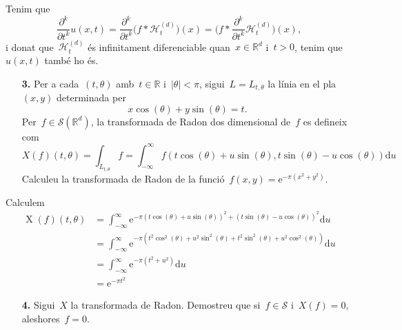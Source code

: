\documentclass[a4paper]{article}
\theoremstyle{plain}
\theoremstyle{definition}
\DeclareMathOperator{\X}{X}
\newcommand{\e}{\mathrm{e}}
\providecommand{\uppi}{\pi}
\newcommand{\diff}{\mathrm{d}}
\newcommand{\abs}[1]{\lvert{#1}\rvert}
\newcommand{\Sc}{\mathcal{S}}
\newcommand{\Hk}{\mathcal{H}}
\newcommand{\RR}{\mathbb{R}}
\begin{document}
Tenim que
\[
    \frac{\partial^{k}}{\partial t^{k}}u(x,t)
    =
    \frac{\partial^{k}}{\partial t^{k}}
    \bigl(f\ast\Hk_{t}^{(d)}\bigr)(x)
    =
    \biggl(
        f\ast\frac{\partial^{k}}{\partial t^{k}}
        \Hk_{t}^{(d)}
    \biggr)(x),
\]
i donat que~\(\Hk_{t}^{(d)}\) és infinitament diferenciable quan~\(x\in\RR^{d}\)
i~\(t>0\), tenim que~\(u(x,t)\) també ho és.

\begin{enumerate}
    \item[\textbf{3.}] Per a cada~\((t,\theta)\) amb~\(t\in\RR\)
        i~\(\abs{\theta}<\uppi\), sigui~\(L=L_{t,\theta}\) la línia en el
        pla~\((x,y)\) determinada per
        \[
            x\cos(\theta) + y\sin(\theta) = t.
        \]
        Per~\(f\in\Sc(\RR^{d})\), la transformada de Radon dos dimensional
        de~\(f\) es defineix com
        \[
            X(f)(t,\theta)
            =
            \int_{L_{t,\theta}}f
            =
            \int_{-\infty}^{\infty}
            f(t\cos(\theta) + u\sin(\theta), t\sin(\theta) - u\cos(\theta))
            \diff u
        \]
        Calculeu la transformada de Radon de la
        funció~\(f(x,y)=\e^{-\uppi(x^{2}+y^{2})}\).
\end{enumerate}

Calculem
\begin{align*}
    \X(f)(t,\theta) &= \int_{-\infty}^{\infty}
                       \e^{-\uppi
                           (t\cos(\theta) + u\sin(\theta))^{2}
                           +
                           (t\sin(\theta) - u\cos(\theta))^{2}}
                       \diff u \\
                    &= \int_{-\infty}^{\infty}
                       \e^{-\uppi
                           (t^{2}\cos^{2}(\theta) + u^{2}\sin^{2}(\theta)
                           +
                           t^{2}\sin^{2}(\theta) + u^{2}\cos^{2}(\theta))}
                       \diff u \\
                    &= \int_{-\infty}^{\infty}
                       \e^{-\uppi(t^{2} + u^{2})}
                       \diff u \\
                    &= \e^{-\uppi t^{2}}
\end{align*}

\begin{enumerate}
    \item[\textbf{4.}] Sigui~\(X\) la transformada de Radon. Demostreu que
        si~\(f\in\Sc\) i~\(X(f)=0\), aleshores~\(f=0\).
\end{enumerate}
\end{document}
